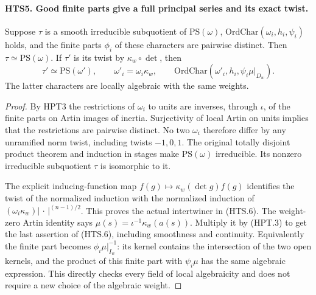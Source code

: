 \documentclass[11pt,a4paper]{article}
\numberwithin{equation}{section}
\theoremstyle{remark}\newtheorem{remark}[theorem]{Remark}
\begin{document}
\paragraph{HTS5. Good finite parts give a full principal series and its exact twist.}
\label{claim:HTS5}
Suppose $\tau$ is a smooth irreducible subquotient of $\mathrm{PS}(\omega)$,
$\mathrm{OrdChar}(\omega_i,h_i,\psi_i)$ holds, and the finite
parts $\phi_i$ of these characters are pairwise distinct.
Then $\tau\simeq\mathrm{PS}(\omega)$.  If $\tau'$ is its twist
by $\kappa_w\circ\det$, then
\[
 \tau'\simeq\mathrm{PS}(\omega'),\qquad
 \omega'_i=\omega_i\kappa_w,\qquad
 \mathrm{OrdChar}(\omega'_i,h_i,\psi_i\mu|_{D_w}).               \tag{HTS.6}
\]
The latter characters are locally algebraic with the same weights.
\begin{proof}
By HPT3 the restrictions of $\omega_i$ to units are inverses,
through $\iota$, of the finite parts on Artin images of inertia.
Surjectivity of local Artin on units implies that the restrictions
are pairwise distinct.  No two $\omega_i$ therefore differ by
any unramified norm twist, including twists $-1,0,1$.
The original totally disjoint product theorem and induction
in stages make $\mathrm{PS}(\omega)$ irreducible.  Its nonzero
irreducible subquotient $\tau$ is isomorphic to it.

The explicit inducing-function map
$f(g)\mapsto\kappa_w(\det g)f(g)$ identifies the twist of the
normalized induction with the normalized induction of
$(\omega_i\kappa_w)|\,\cdot\,|^{(n-1)/2}$.
This proves the actual intertwiner in (HTS.6).  The weight-zero
Artin identity says $\mu(s)=\iota^{-1}\kappa_w(a(s))$.
Multiply it by (HPT.3) to get the last assertion of (HTS.6),
including smoothness and continuity.  Equivalently the finite
part becomes $\phi_i\mu|_{I_w}^{-1}$: its kernel contains the
intersection of the two open kernels, and the product of this
finite part with $\psi_i\mu$ has the same algebraic expression.
This directly checks every field of local algebraicity and
does not require a new choice of the algebraic weight.
\end{proof}

\end{document}
